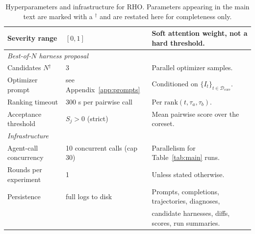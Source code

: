 \documentclass{llmxive}
\providecommand{\method}{\textsc{RHO}}
\begin{document}
\begin{table}[t]
\begin{tabular}{lll}
Severity range              & $[0,1]$                                      & Soft attention weight, not a hard threshold. \\
\midrule
\multicolumn{3}{l}{\textit{Best-of-$N$ harness proposal}} \\
\midrule
Candidates $N$$^{\dagger}$  & 3                                            & Parallel optimizer samples. \\
Optimizer prompt            & see Appendix~\ref{app:prompts}               & Conditioned on $\{I_t\}_{t\in\mathcal{D}_{\mathrm{core}}}$. \\
Ranking timeout             & 300 s per pairwise call                      & Per $\mathrm{rank}(t,\tau_a,\tau_b)$. \\
Acceptance threshold        & $S_j > 0$ (strict)                           & Mean pairwise score over the coreset. \\
\midrule
\multicolumn{3}{l}{\textit{Infrastructure}} \\
\midrule
Agent-call concurrency      & 10 concurrent calls (cap 30)                 & Parallelism for Table~\ref{tab:main} runs. \\
Rounds per experiment       & 1                                            & Unless stated otherwise. \\
Persistence                 & full logs to disk                            & Prompts, completions, trajectories, diagnoses, \\
                            &                                              & candidate harnesses, diffs, scores, run summaries. \\
\bottomrule
\end{tabular}
\caption{Hyperparameters and infrastructure for \method{}. Parameters appearing in the main text are marked with a $^{\dagger}$ and are restated here for completeness only.}
\label{tab:hparams}
\end{table}
\end{document}
